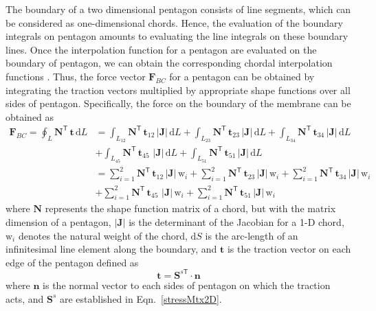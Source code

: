 The boundary of a two dimensional pentagon consists of line segments, which can be considered as one-dimensional chords. Hence, the evaluation of the boundary integrals on pentagon amounts to evaluating the line integrals on these boundary lines. Once the interpolation function for a pentagon are evaluated on the boundary of pentagon, we can obtain the corresponding chordal interpolation functions \cite{Reddy93}.
Thus, the force vector $\mathbf{F}_{BC}$  for a pentagon can be obtained by integrating the traction vectors multiplied by appropriate shape functions over all sides of pentagon. Specifically, the force on the boundary of the membrane can be obtained as
\begin{equation}
\begin{aligned}
\mathbf{F}_{BC}  = \oint_L \mathbf{N}^{\mathsf{T}} \, \mathbf{t} \, \mathrm{d} L & = \int_{L_{12}} \mathbf{N}^{\mathsf{T}} \, \mathbf{t}_{12} \,|\mathbf{J}| \, \mathrm{d} L + \int_{L_{23}} \mathbf{N}^{\mathsf{T}} \, \mathbf{t}_{23} \,|\mathbf{J}| \, \mathrm{d} L + \int_{L_{34}} \mathbf{N}^{\mathsf{T}} \, \mathbf{t}_{34} \,|\mathbf{J}| \, \mathrm{d} L \\
& + \int_{L_{45}} \mathbf{N}^{\mathsf{T}} \, \mathbf{t}_{45} \, \,|\mathbf{J}| \, \mathrm{d} L + \int_{L_{51}} \mathbf{N}^{\mathsf{T}} \, \mathbf{t}_{51} \,|\mathbf{J}| \, \mathrm{d} L \\
& = \sum_{i=1}^{2} \mathbf{N}^{\mathsf{T}} \, \mathbf{t}_{12} \,|\mathbf{J}| \, \mathrm{w}_i + \sum_{i=1}^{2} \mathbf{N}^{\mathsf{T}} \, \mathbf{t}_{23} \,|\mathbf{J}| \, \mathrm{w}_i + \sum_{i=1}^{2} \mathbf{N}^{\mathsf{T}} \, \mathbf{t}_{34} \,|\mathbf{J}| \, \mathrm{w}_i \\
& + \sum_{i=1}^{2} \mathbf{N}^{\mathsf{T}} \, \mathbf{t}_{45} \, \,|\mathbf{J}| \, \mathrm{w}_i + \sum_{i=1}^{2} \mathbf{N}^{\mathsf{T}} \, \mathbf{t}_{51} \,|\mathbf{J}| \, \mathrm{w}_i
\end{aligned}
\end{equation}
where $\mathbf{N}$ represents the shape function matrix of a chord, but with the matrix dimension of a pentagon, $|\mathbf{J}|$ is the determinant of the Jacobian for a 1-D chord, $\mathrm{w}_i$ denotes the natural weight of the chord, $\mathrm{d} S$ is the arc-length of an infinitesimal line element along the boundary, and $\mathbf{t}$ is the traction vector on each edge of the pentagon defined as
\begin{equation}
\mathbf{t} = \mathbf{S}^{s\mathsf{T}} \cdot \mathbf{n} 
\end{equation}
where $ \mathbf{n} $ is the normal vector to each sides of pentagon on which the traction acts, and $\mathbf{S}^s $ are established in Eqn.~\eqref{stressMtx2D}.

